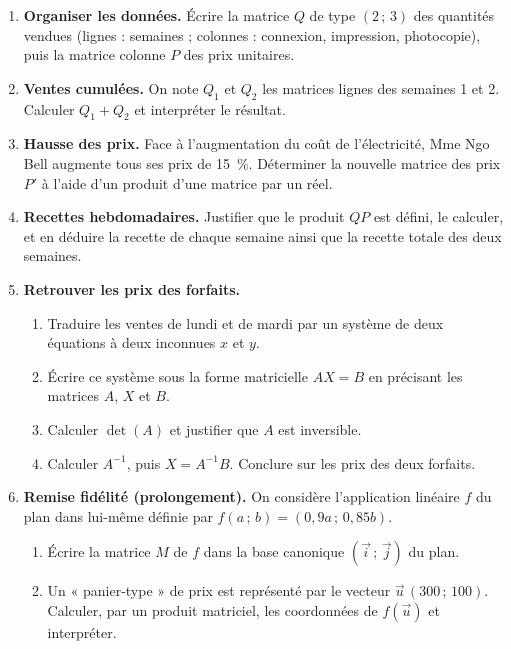 \documentclass[11pt]{article}
\newcounter{popsec}
\newcounter{popsub}
\newcommand{\courssub}[1]{%
  \stepcounter{popsub}%
  \par\vspace{9pt}\noindent{\popxbold\fontsize{11.5}{13}\selectfont\color{popink}{\color{poporange}\thepopsec.\thepopsub}\hspace{6pt}#1}\par\nopagebreak\vspace{4pt}
}
\begin{document}
\begin{enumerate}
\item \textbf{Organiser les données.} Écrire la matrice $Q$ de type $(2\,;\,3)$ des quantités vendues (lignes : semaines ; colonnes : connexion, impression, photocopie), puis la matrice colonne $P$ des prix unitaires.
\item \textbf{Ventes cumulées.} On note $Q_1$ et $Q_2$ les matrices lignes des semaines 1 et 2. Calculer $Q_1+Q_2$ et interpréter le résultat.
\item \textbf{Hausse des prix.} Face à l'augmentation du coût de l'électricité, Mme Ngo Bell augmente tous ses prix de \SI{15}{\percent}. Déterminer la nouvelle matrice des prix $P'$ à l'aide d'un produit d'une matrice par un réel.
\item \textbf{Recettes hebdomadaires.} Justifier que le produit $QP$ est défini, le calculer, et en déduire la recette de chaque semaine ainsi que la recette totale des deux semaines.
\item \textbf{Retrouver les prix des forfaits.}
\begin{enumerate}
\item Traduire les ventes de lundi et de mardi par un système de deux équations à deux inconnues $x$ et $y$.
\item Écrire ce système sous la forme matricielle $AX=B$ en précisant les matrices $A$, $X$ et $B$.
\item Calculer $\det(A)$ et justifier que $A$ est inversible.
\item Calculer $A^{-1}$, puis $X=A^{-1}B$. Conclure sur les prix des deux forfaits.
\end{enumerate}
\item \textbf{Remise fidélité (prolongement).} On considère l'application linéaire $f$ du plan dans lui-même définie par $f(a\,;\,b)=(0{,}9a\,;\,0{,}85b)$.
\begin{enumerate}
\item Écrire la matrice $M$ de $f$ dans la base canonique $(\vec{i}\,;\,\vec{j})$ du plan.
\item Un « panier-type » de prix est représenté par le vecteur $\vec{u}\,(300\,;\,100)$. Calculer, par un produit matriciel, les coordonnées de $f(\vec{u})$ et interpréter.
\end{enumerate}
\end{enumerate}

\courssub{Ressources à mobiliser}
\end{document}
